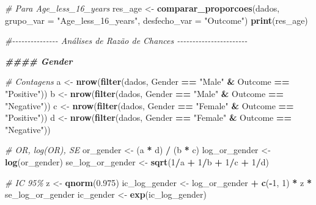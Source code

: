 \documentclass[
]{article}
\newenvironment{Shaded}{\begin{snugshade}}{\end{snugshade}}
\newcommand{\AttributeTok}[1]{\textcolor[rgb]{0.13,0.29,0.53}{#1}}
\newcommand{\CommentTok}[1]{\textcolor[rgb]{0.56,0.35,0.01}{\textit{#1}}}
\newcommand{\DecValTok}[1]{\textcolor[rgb]{0.00,0.00,0.81}{#1}}
\newcommand{\DocumentationTok}[1]{\textcolor[rgb]{0.56,0.35,0.01}{\textbf{\textit{#1}}}}
\newcommand{\FloatTok}[1]{\textcolor[rgb]{0.00,0.00,0.81}{#1}}
\newcommand{\FunctionTok}[1]{\textcolor[rgb]{0.13,0.29,0.53}{\textbf{#1}}}
\newcommand{\NormalTok}[1]{#1}
\newcommand{\OtherTok}[1]{\textcolor[rgb]{0.56,0.35,0.01}{#1}}
\newcommand{\SpecialCharTok}[1]{\textcolor[rgb]{0.81,0.36,0.00}{\textbf{#1}}}
\newcommand{\StringTok}[1]{\textcolor[rgb]{0.31,0.60,0.02}{#1}}
\begin{document}
\begin{Shaded}
\begin{Highlighting}[]
\CommentTok{\# Para Age\_less\_16\_years}
\NormalTok{res\_age }\OtherTok{\textless{}{-}} \FunctionTok{comparar\_proporcoes}\NormalTok{(dados, }\AttributeTok{grupo\_var =} \StringTok{"Age\_less\_16\_years"}\NormalTok{, }\AttributeTok{desfecho\_var =} \StringTok{"Outcome"}\NormalTok{)}
\FunctionTok{print}\NormalTok{(res\_age)}

\CommentTok{\#{-}{-}{-}{-}{-}{-}{-}{-}{-}{-}{-}{-}{-}{-}{-} Análises de Razão de Chances {-}{-}{-}{-}{-}{-}{-}{-}{-}{-}{-}{-}{-}{-}{-}{-}{-}{-}{-}{-}{-}{-}{-}}

\DocumentationTok{\#\#\#\# Gender}

\CommentTok{\# Contagens}
\NormalTok{a }\OtherTok{\textless{}{-}} \FunctionTok{nrow}\NormalTok{(}\FunctionTok{filter}\NormalTok{(dados, Gender }\SpecialCharTok{==} \StringTok{"Male"} \SpecialCharTok{\&}\NormalTok{ Outcome }\SpecialCharTok{==} \StringTok{"Positive"}\NormalTok{))}
\NormalTok{b }\OtherTok{\textless{}{-}} \FunctionTok{nrow}\NormalTok{(}\FunctionTok{filter}\NormalTok{(dados, Gender }\SpecialCharTok{==} \StringTok{"Male"} \SpecialCharTok{\&}\NormalTok{ Outcome }\SpecialCharTok{==} \StringTok{"Negative"}\NormalTok{))}
\NormalTok{c }\OtherTok{\textless{}{-}} \FunctionTok{nrow}\NormalTok{(}\FunctionTok{filter}\NormalTok{(dados, Gender }\SpecialCharTok{==} \StringTok{"Female"} \SpecialCharTok{\&}\NormalTok{ Outcome }\SpecialCharTok{==} \StringTok{"Positive"}\NormalTok{))}
\NormalTok{d }\OtherTok{\textless{}{-}} \FunctionTok{nrow}\NormalTok{(}\FunctionTok{filter}\NormalTok{(dados, Gender }\SpecialCharTok{==} \StringTok{"Female"} \SpecialCharTok{\&}\NormalTok{ Outcome }\SpecialCharTok{==} \StringTok{"Negative"}\NormalTok{))}

\CommentTok{\# OR, log(OR), SE}
\NormalTok{or\_gender }\OtherTok{\textless{}{-}}\NormalTok{ (a }\SpecialCharTok{*}\NormalTok{ d) }\SpecialCharTok{/}\NormalTok{ (b }\SpecialCharTok{*}\NormalTok{ c)}
\NormalTok{log\_or\_gender }\OtherTok{\textless{}{-}} \FunctionTok{log}\NormalTok{(or\_gender)}
\NormalTok{se\_log\_or\_gender }\OtherTok{\textless{}{-}} \FunctionTok{sqrt}\NormalTok{(}\DecValTok{1}\SpecialCharTok{/}\NormalTok{a }\SpecialCharTok{+} \DecValTok{1}\SpecialCharTok{/}\NormalTok{b }\SpecialCharTok{+} \DecValTok{1}\SpecialCharTok{/}\NormalTok{c }\SpecialCharTok{+} \DecValTok{1}\SpecialCharTok{/}\NormalTok{d)}

\CommentTok{\# IC 95\%}
\NormalTok{z }\OtherTok{\textless{}{-}} \FunctionTok{qnorm}\NormalTok{(}\FloatTok{0.975}\NormalTok{)}
\NormalTok{ic\_log\_gender }\OtherTok{\textless{}{-}}\NormalTok{ log\_or\_gender }\SpecialCharTok{+} \FunctionTok{c}\NormalTok{(}\SpecialCharTok{{-}}\DecValTok{1}\NormalTok{, }\DecValTok{1}\NormalTok{) }\SpecialCharTok{*}\NormalTok{ z }\SpecialCharTok{*}\NormalTok{ se\_log\_or\_gender}
\NormalTok{ic\_gender }\OtherTok{\textless{}{-}} \FunctionTok{exp}\NormalTok{(ic\_log\_gender)}


\end{Highlighting}
\end{Shaded}
\end{document}
